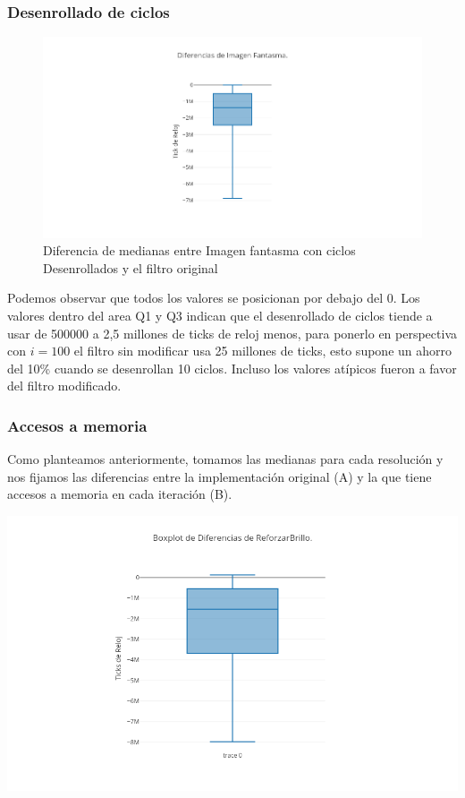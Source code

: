 \documentclass[a4paper]{article}
\begin{document}
\clearpage

\subsubsection{Desenrollado de ciclos}

\begin{figure}[h!]
	\includegraphics[width=\linewidth]{img/BoxplotImagenFantasma.png}
	\caption{Diferencia de medianas entre Imagen fantasma con ciclos Desenrollados y el filtro original}
\end{figure}

Podemos observar que todos los valores se posicionan por debajo del 0. Los valores dentro del area Q1 y Q3 indican que el desenrollado de ciclos tiende a usar de 500000 a 2,5 millones de ticks de reloj menos, para ponerlo en perspectiva con $i = 100$ el filtro sin modificar usa 25 millones de ticks, esto supone un ahorro del 10\% cuando se desenrollan 10 ciclos. Incluso los valores at\'ipicos fueron a favor del filtro modificado.

\subsubsection{Accesos a memoria}

Como planteamos anteriormente, tomamos las medianas para cada resolución y nos fijamos las diferencias entre la implementación original (A) y la que tiene accesos a memoria en cada iteración (B).


\includegraphics[scale=0.5]{img/BoxplotReforzarBrillo.png}
\end{document}
